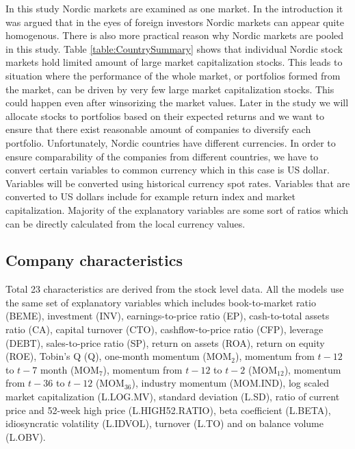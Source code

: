 \documentclass[12pt]{article}
\begin{document}
In this study Nordic markets are examined as one market. In the introduction it was argued that in the eyes of foreign investors Nordic markets can appear quite homogenous. There is also more practical reason why Nordic markets are pooled in this study. Table \ref{table:CountrySummary} shows that individual Nordic stock markets hold limited amount of large market capitalization stocks. This leads to situation where the performance of the whole market, or portfolios formed from the market, can be driven by very few large market capitalization stocks. This could happen even after winsorizing the market values. Later in the study we will allocate stocks to portfolios based on their expected returns and we want to ensure that there exist reasonable amount of companies to diversify each portfolio. Unfortunately, Nordic countries have different currencies. In order to ensure comparability of the companies from different countries, we have to convert certain variables to common currency which in this case is US dollar. Variables will be converted using historical currency spot rates. Variables that are converted to US dollars include for example return index and market capitalization. Majority of the explanatory variables are some sort of ratios which can be directly calculated from the local currency values. \par

\subsection{Company characteristics}\label{CompanyCharacteristics}

Total 23 characteristics are derived from the stock level data. All the models use the same set of explanatory variables which includes book-to-market ratio (BEME), investment (INV), earnings-to-price ratio (EP), cash-to-total assets ratio (CA), capital turnover (CTO), cashflow-to-price ratio (CFP), leverage (DEBT), sales-to-price ratio (SP), return on assets (ROA), return on equity (ROE), Tobin's Q (Q), one-month momentum (MOM$_2$), momentum from $t-12$ to $t-7$ month (MOM$_7$), momentum from $t-12$ to $t-2$ (MOM$_{12}$), momentum from $t-36$ to $t-12$ (MOM$_{36}$), industry momentum (MOM.IND), log scaled market capitalization (L.LOG.MV), standard deviation (L.SD), ratio of current price and 52-week high price (L.HIGH52.RATIO), beta coefficient (L.BETA), idiosyncratic volatility (L.IDVOL), turnover (L.TO) and on balance volume (L.OBV). \par
\end{document}
